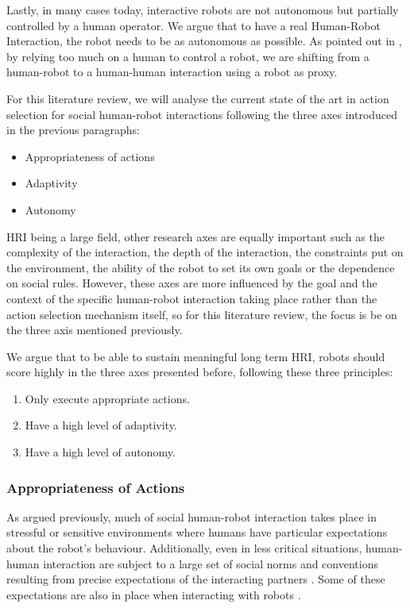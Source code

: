     Lastly, in many cases today, interactive robots are not autonomous but
    partially controlled by a human operator. We argue that to have a real
    Human-Robot Interaction, the robot needs to be as autonomous as possible. As
    pointed out in  \citet{baxter2016characterising}, by relying too much on a
    human to control a robot, we are shifting from a human-robot to a
    human-human interaction using a robot as proxy. 

    For this literature review, we will analyse the current state of the art in
    action selection for social human-robot interactions following the three
    axes introduced in the previous paragraphs:

    \begin{itemize}
        \item Appropriateness of actions
        \item Adaptivity
        \item Autonomy
    \end{itemize}

    HRI being a large field, other research axes are equally important such as
    the complexity of the interaction, the depth of the interaction, the
    constraints put on the environment, the ability of the robot to set its own
    goals or the dependence on social rules. However, these axes are more
    influenced by the goal and the context of the specific human-robot
    interaction taking place rather than the action selection mechanism itself,
    so for this literature review, the focus is be on the three axis mentioned
    previously.

    We argue that to be able to sustain meaningful long term HRI, robots should
    score highly in the three axes presented before, following these three
    principles:

    \begin{enumerate}
        \item Only execute appropriate actions.
        \item Have a high level of adaptivity.
        \item Have a high level of autonomy.
    \end{enumerate}

\subsubsection{Appropriateness of Actions} \label{ssec:appropriateness}
        
    As argued previously, much of social human-robot interaction takes place in
    stressful or sensitive environments where humans have particular
    expectations about the robot's behaviour. Additionally, even in less
    critical situations, human-human interaction are subject to a large set of
    social norms and conventions resulting from precise expectations of the
    interacting partners \citep{sherif1936psychology}. Some of these
    expectations are also in place when interacting with robots
    \citep{bartneck2004design}.
	
